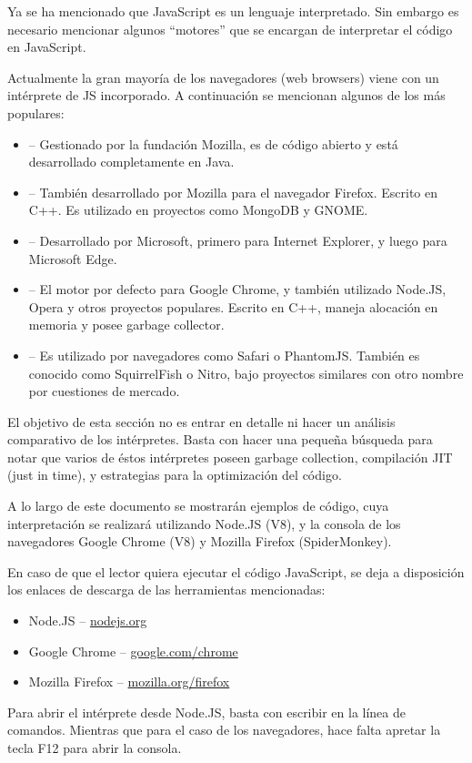 Ya se ha mencionado que JavaScript es un lenguaje interpretado. Sin embargo es necesario mencionar algunos "`motores"' que se encargan de interpretar el código en JavaScript.

Actualmente la gran mayoría de los navegadores (web browsers) viene con un intérprete de JS incorporado. A continuación se mencionan algunos de los más populares:

\begin{itemize}
\item {} -- Gestionado por la fundación Mozilla, es de código abierto y está desarrollado completamente en Java.
\item {} -- También desarrollado por Mozilla para el navegador Firefox. Escrito en C++. Es utilizado en proyectos como MongoDB y GNOME.
\item {} -- Desarrollado por Microsoft, primero para Internet Explorer, y luego para Microsoft Edge.
\item {} -- El motor por defecto para Google Chrome, y también utilizado Node.JS, Opera y otros proyectos populares. Escrito en C++, maneja alocación en memoria y posee garbage collector.
\item {} -- Es utilizado por navegadores como Safari o PhantomJS. También es conocido como SquirrelFish o Nitro, bajo proyectos similares con otro nombre por cuestiones de mercado.
\end{itemize}

El objetivo de esta sección no es entrar en detalle ni hacer un análisis comparativo de los intérpretes. Basta con hacer una pequeña búsqueda para notar que varios de éstos intérpretes poseen garbage collection, compilación JIT (just in time), y estrategias para la optimización del código.

A lo largo de este documento se mostrarán ejemplos de código, cuya interpretación se realizará utilizando Node.JS (V8), y la consola de los navegadores Google Chrome (V8) y Mozilla Firefox (SpiderMonkey).

En caso de que el lector quiera ejecutar el código JavaScript, se deja a disposición los enlaces de descarga de las herramientas mencionadas:

\begin{itemize}
\item Node.JS -- \href{https://nodejs.org/es/}{nodejs.org}
\item Google Chrome -- \href{https://google.com/chrome}{google.com/chrome}
\item Mozilla Firefox -- \href{https://www.mozilla.org/firefox}{mozilla.org/firefox}
\end{itemize}

Para abrir el intérprete desde Node.JS, basta con escribir  en la línea de comandos. Mientras que para el caso de los navegadores, hace falta apretar la tecla F12 para abrir la consola.

